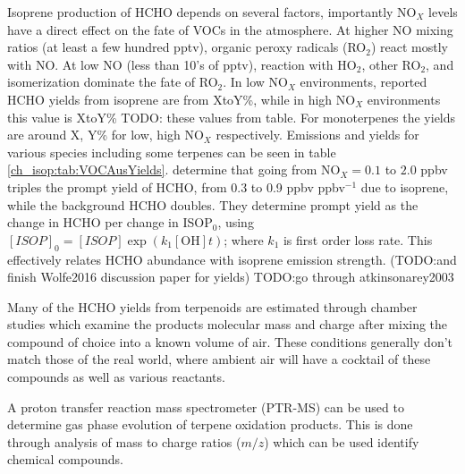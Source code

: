     Isoprene production of HCHO depends on several factors, importantly NO$_X$ levels have a direct effect on the fate of VOCs in the atmosphere.
    At higher NO mixing ratios (at least a few hundred pptv), organic peroxy radicals (RO$_2$) react mostly with NO. 
    At low NO (less than 10's of pptv), reaction with HO$_2$, other RO$_2$, and isomerization dominate the fate of RO$_2$.
    In low NO$_X$ environments, reported HCHO yields from isoprene are from XtoY\%, while in high NO$_X$ environments this value is XtoY\% TODO: these values from table.
    For monoterpenes the yields are around X, Y\% for low, high NO$_X$ respectively.
    Emissions and yields for various species including some terpenes can be seen in table \ref{ch_isop:tab:VOCAusYields}.
    \citet{Wolfe2016} determine that going from NO$_X = 0.1$ to $2.0$ ppbv triples the prompt yield of HCHO, from 0.3 to 0.9 ppbv ppbv$^{-1}$ due to isoprene, while the background HCHO doubles.
    They determine prompt yield as the change in HCHO per change in ISOP$_0$, using $[ISOP]_0=[ISOP]\exp(k_1[\mathrm{OH}]t)$; where $k_1$ is first order loss rate.
    This effectively relates HCHO abundance with isoprene emission strength.
    (TODO:and finish Wolfe2016 discussion paper for yields)
    TODO:go through atkinsonarey2003
    
    Many of the HCHO yields from terpenoids are estimated through chamber studies which examine the products molecular mass and charge after mixing the compound of choice into a known volume of air.
    These conditions generally don't match those of the real world, where ambient air will have a cocktail of these compounds as well as various reactants.
    
    A proton transfer reaction mass spectrometer (PTR-MS) can be used to determine gas phase evolution of terpene oxidation products.
    This is done through analysis of mass to charge ratios ($m/z$) which can be used identify chemical compounds.
    
